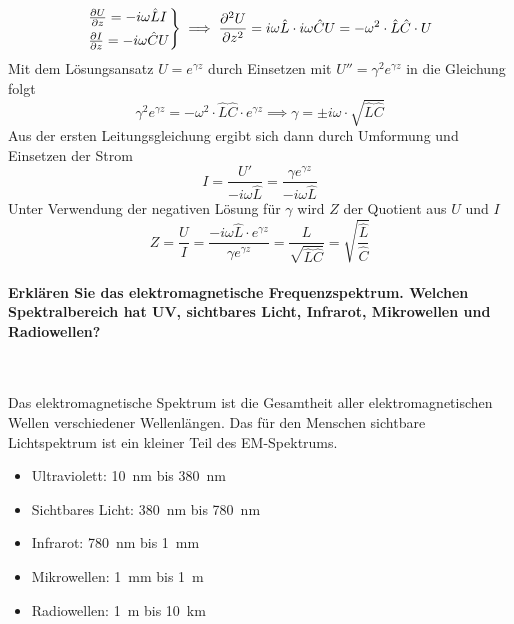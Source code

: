 \documentclass[a4paper, 11pt, parskip=half]{scrartcl}
\begin{document}
\begin{equation}
    \begin{rcases}
        \pdv{U}{z} = - i \omega \hat{L} I \\
        \pdv{I}{z} = - i \omega \hat{C} U
    \end{rcases}
    \implies
    \pdv[2]{U}{z}
    = i \omega \hat{L} \cdot i \omega \hat{C} U
    = - \omega^2 \cdot \hat{L} \hat{C} \cdot U
\end{equation}
Mit dem Lösungsansatz $U = e^{\gamma z}$ durch Einsetzen mit $U'' = \gamma^2 e^{\gamma z}$ in die
Gleichung folgt
\begin{equation}
    \gamma^2 e^{\gamma z} = - \omega^2 \cdot \hat{L} \hat{C} \cdot e^{\gamma z}
    \implies
    \gamma = \pm i \omega \cdot \sqrt{\hat{L} \hat{C}}
\end{equation}
Aus der ersten Leitungsgleichung ergibt sich dann durch Umformung und Einsetzen der Strom
\begin{equation}
    I = \frac{U'}{-i \omega \hat{L}} = \frac{\gamma e^{\gamma z}}{-i \omega \hat{L}}
\end{equation}
Unter Verwendung der negativen Lösung für $\gamma$ wird $Z$ der Quotient aus $U$ und $I$
\begin{equation}
    Z
    = \frac{U}{I}
    = \frac{-i \omega \hat{L} \cdot e^{\gamma z}}{\gamma e^{\gamma z}}
    = \frac{L}{\sqrt{\hat{L} \hat{C}}}
    = \sqrt{\frac{\hat{L}}{\hat{C}}}
\end{equation}

\paragraph{Erklären Sie das elektromagnetische Frequenzspektrum. Welchen Spektralbereich hat UV,
sichtbares Licht, Infrarot, Mikrowellen und Radiowellen?} ~

Das elektromagnetische Spektrum ist die Gesamtheit aller elektromagnetischen Wellen verschiedener
Wellenlängen. Das für den Menschen sichtbare Lichtspektrum ist ein kleiner Teil des EM-Spektrums.

\begin{itemize}
    \item Ultraviolett: \SI{10}{\nm} bis \SI{380}{\nm}
    \item Sichtbares Licht: \SI{380}{\nm} bis \SI{780}{\nm}
    \item Infrarot: \SI{780}{\nm} bis \SI{1}{\mm}
    \item Mikrowellen: \SI{1}{\mm} bis \SI{1}{\m}
    \item Radiowellen: \SI{1}{\m} bis \SI{10}{\km}
\end{itemize}
\end{document}
